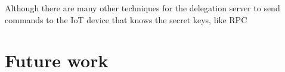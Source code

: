 
Although there are many other techniques for the delegation server to send commands to the IoT device that knows the secret keys, like RPC


\section{Future work}






